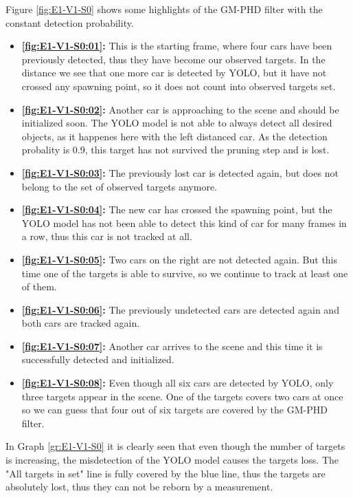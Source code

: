 Figure \ref{fig:E1-V1-S0} shows some highlights of the GM-PHD filter with the constant detection probability.
\begin{itemize}
    \item \textbf{\ref{fig:E1-V1-S0:01}:} This is the starting frame, where four cars have been previously detected, thus they have become our observed targets. In the distance we see that one more car is detected by YOLO, but it have not crossed any spawning point, so it does not count into observed targets set.
    \item \textbf{\ref{fig:E1-V1-S0:02}:} Another car is approaching to the scene and should be initialized soon. The YOLO model is not able to always detect all desired objects, as it happenes here with the left distanced car. As the detection probality is 0.9, this target has not survived the pruning step and is lost.
    \item \textbf{\ref{fig:E1-V1-S0:03}:} The previously lost car is detected again, but does not belong to the set of observed targets anymore.
    \item \textbf{\ref{fig:E1-V1-S0:04}:} The new car has crossed the spawning point, but the YOLO model has not been able to detect this kind of car for many frames in a row, thus this car is not tracked at all.
    \item \textbf{\ref{fig:E1-V1-S0:05}:} Two cars on the right are not detected again. But this time one of the targets is able to survive, so we continue to track at least one of them.
    \item \textbf{\ref{fig:E1-V1-S0:06}:} The previously undetected cars are detected again and both cars are tracked again.
    \item \textbf{\ref{fig:E1-V1-S0:07}:} Another car arrives to the scene and this time it is successfully detected and initialized.
    \item \textbf{\ref{fig:E1-V1-S0:08}:} Even though all six cars are detected by YOLO, only three targets appear in the scene. One of the targets covers two cars at once so we can guess that four out of six targets are covered by the GM-PHD filter.
\end{itemize}

In Graph \ref{gr:E1-V1-S0} it is clearly seen that even though the number of targets is increasing, the misdetection of the YOLO model causes the targets loss. The "All targets in set" line is fully covered by the blue line, thus the targets are absolutely lost, thus they can not be reborn by a measurement.

